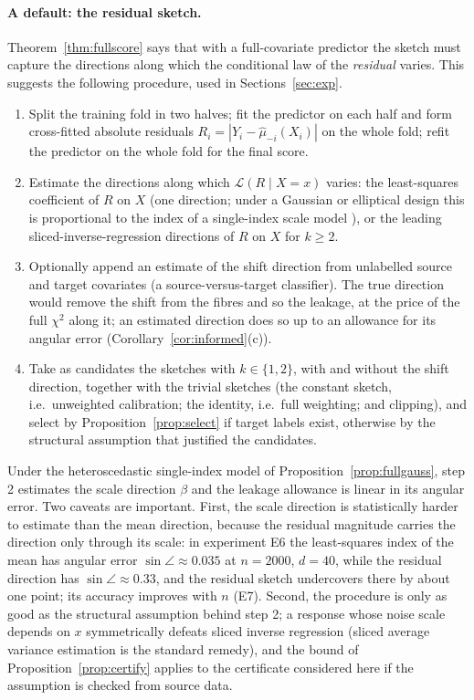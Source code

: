 \documentclass[11pt,a4paper]{article}
\theoremstyle{plain}
\theoremstyle{definition}
\theoremstyle{remark}
\begin{document}
\paragraph{A default: the residual sketch.}
Theorem~\ref{thm:fullscore} says that with a full-covariate predictor the sketch must capture the directions along which the conditional law of the \emph{residual} varies. This suggests the following procedure, used in Sections~\ref{sec:exp}.
\begin{enumerate}[leftmargin=1.8em,itemsep=1pt]
\item Split the training fold in two halves; fit the predictor on each half and form cross-fitted absolute residuals $R_i=|Y_i-\hat\mu_{-i}(X_i)|$ on the whole fold; refit the predictor on the whole fold for the final score.
\item Estimate the directions along which $\mathcal L(R\mid X=x)$ varies: the least-squares coefficient of $R$ on $X$ (one direction; under a Gaussian or elliptical design this is proportional to the index of a single-index scale model \cite{brillinger1983,li1991}), or the leading sliced-inverse-regression directions of $R$ on $X$ \cite{li1991} for $k\ge2$.
\item Optionally append an estimate of the shift direction from unlabelled source and target covariates (a source-versus-target classifier). The true direction would remove the shift from the fibres and so the leakage, at the price of the full $\chi^2$ along it; an estimated direction does so up to an allowance for its angular error (Corollary~\ref{cor:informed}(c)).
\item Take as candidates the sketches with $k\in\{1,2\}$, with and without the shift direction, together with the trivial sketches (the constant sketch, i.e.\ unweighted calibration; the identity, i.e.\ full weighting; and clipping), and select by Proposition~\ref{prop:select} if target labels exist, otherwise by the structural assumption that justified the candidates.
\end{enumerate}
Under the heteroscedastic single-index model of Proposition~\ref{prop:fullgauss}, step 2 estimates the scale direction $\beta$ and the leakage allowance is linear in its angular error. Two caveats are important. First, the scale direction is statistically harder to estimate than the mean direction, because the residual magnitude carries the direction only through its scale: in experiment E6 the least-squares index of the mean has angular error $\sin\angle\approx0.035$ at $n=2000$, $d=40$, while the residual direction has $\sin\angle\approx0.33$, and the residual sketch undercovers there by about one point; its accuracy improves with $n$ (E7). Second, the procedure is only as good as the structural assumption behind step 2; a response whose noise scale depends on $x$ symmetrically defeats sliced inverse regression (sliced average variance estimation \cite{cook1998} is the standard remedy), and the bound of Proposition~\ref{prop:certify} applies to the certificate considered here if the assumption is checked from source data.
\end{document}
